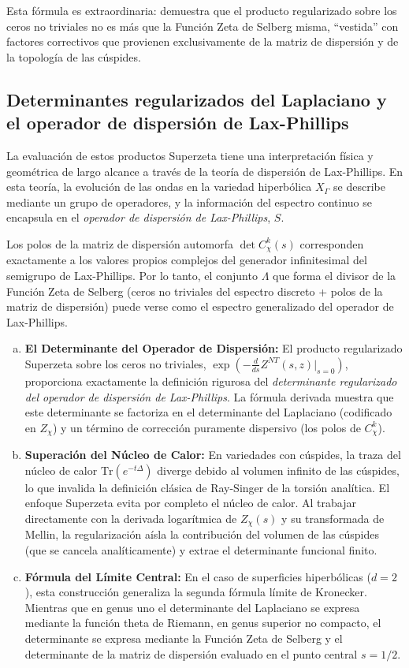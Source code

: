 Esta fórmula es extraordinaria: demuestra que el producto regularizado sobre los ceros no triviales no es más que la Función Zeta de Selberg misma, ``vestida'' con factores correctivos que provienen exclusivamente de la matriz de dispersión y de la topología de las cúspides.

\subsection{Determinantes regularizados del Laplaciano y el operador de dispersión de Lax-Phillips}

La evaluación de estos productos Superzeta tiene una interpretación física y geométrica de largo alcance a través de la teoría de dispersión de Lax-Phillips. En esta teoría, la evolución de las ondas en la variedad hiperbólica $X_\Gamma$ se describe mediante un grupo de operadores, y la información del espectro continuo se encapsula en el \textit{operador de dispersión de Lax-Phillips}, $S$.

Los polos de la matriz de dispersión automorfa $\det C_\chi^k(s)$ corresponden exactamente a los valores propios complejos del generador infinitesimal del semigrupo de Lax-Phillips. Por lo tanto, el conjunto $\Lambda$ que forma el divisor de la Función Zeta de Selberg (ceros no triviales del espectro discreto + polos de la matriz de dispersión) puede verse como el espectro generalizado del operador de Lax-Phillips.

\begin{enumerate}[a)]
    \item \textbf{El Determinante del Operador de Dispersión:} El producto regularizado Superzeta sobre los ceros no triviales, $\exp(-\frac{d}{ds}Z^{NT}(s,z)|_{s=0})$, proporciona exactamente la definición rigurosa del \textit{determinante regularizado del operador de dispersión de Lax-Phillips}. La fórmula derivada muestra que este determinante se factoriza en el determinante del Laplaciano (codificado en $Z_\chi$) y un término de corrección puramente dispersivo (los polos de $C_\chi^k$).
    \item \textbf{Superación del Núcleo de Calor:} En variedades con cúspides, la traza del núcleo de calor $\text{Tr}(e^{-t\Delta})$ diverge debido al volumen infinito de las cúspides, lo que invalida la definición clásica de Ray-Singer de la torsión analítica. El enfoque Superzeta evita por completo el núcleo de calor. Al trabajar directamente con la derivada logarítmica de $Z_\chi(s)$ y su transformada de Mellin, la regularización aísla la contribución del volumen de las cúspides (que se cancela analíticamente) y extrae el determinante funcional finito.
    \item \textbf{Fórmula del Límite Central:} En el caso de superficies hiperbólicas ($d=2$), esta construcción generaliza la segunda fórmula límite de Kronecker. Mientras que en genus uno el determinante del Laplaciano se expresa mediante la función theta de Riemann, en genus superior no compacto, el determinante se expresa mediante la Función Zeta de Selberg y el determinante de la matriz de dispersión evaluado en el punto central $s=1/2$.
\end{enumerate}

